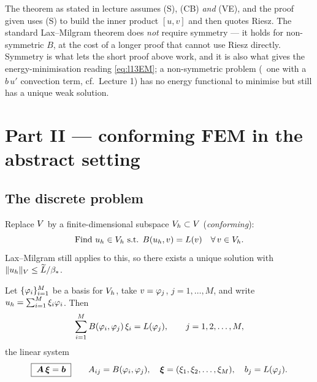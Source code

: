 \begin{pitfall}
The theorem as stated in lecture assumes (S), (CB) \emph{and} (VE), and the
proof given uses (S) to build the inner product $[u,v]$ and then quotes Riesz.
The standard Lax--Milgram theorem does \emph{not} require symmetry --- it holds
for non-symmetric $B$, at the cost of a longer proof that cannot use Riesz
directly. Symmetry is what lets the short proof above work, and it is also what
gives the energy-minimisation reading \eqref{eq:l13EM}; a non-symmetric problem
(\eg\ one with a $b\,u'$ convection term, cf.\ Lecture 1) has no energy
functional to minimise but still has a unique weak solution.
\end{pitfall}

\section*{Part II --- conforming FEM in the abstract setting}
\subsection*{The discrete problem}

Replace $V$ by a finite-dimensional subspace $V_{h}\subset V$
(\emph{conforming}):
\begin{equation}\label{eq:l13fem}
  \text{Find } u_{h}\in V_{h} \text{ s.t. } B(u_{h},v)=L(v)\quad\forall\,v\in V_{h} .
\end{equation}
Lax--Milgram still applies to this, so there exists a unique solution with
$\lVert u_{h}\rVert_{V}\le\widetilde{L}/\beta_{*}$.

\medskip
Let $\{\varphi_{i}\}_{i=1}^{M}$ be a basis for $V_{h}$, take $v=\varphi_{j}$,
$j=1,\dots,M$, and write $u_{h}=\sum_{i=1}^{M}\xi_{i}\varphi_{i}$. Then
\begin{equation}\label{eq:l13sum}
  \sum_{i=1}^{M}B(\varphi_{i},\varphi_{j})\,\xi_{i}=L(\varphi_{j}),
  \qquad j=1,2,\dots,M,
\end{equation}
\ie the linear system
\begin{equation}\label{eq:l13system}
  \boxed{\;\bm{A}\,\bm{\xi}=\bm{b}\;}
  \qquad
  A_{ij}=B(\varphi_{i},\varphi_{j}),\quad
  \bm{\xi}=(\xi_{1},\xi_{2},\dots,\xi_{M}),\quad
  b_{j}=L(\varphi_{j}).
\end{equation}

